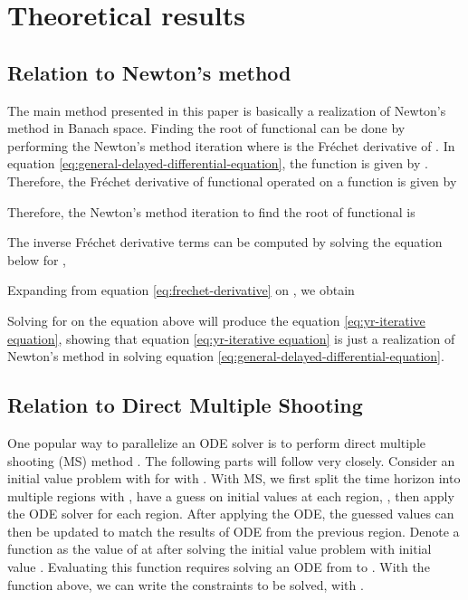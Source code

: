 \appendix

\section{Theoretical results}
\subsection{Relation to Newton's method}
\label{appsec:relation-to-newton}

The main method presented in this paper is basically a realization of Newton's method in Banach space.
Finding the root of functional  can be done by performing the Newton's method iteration  where  is the Fr\'{e}chet derivative of .
In equation \ref{eq:general-delayed-differential-equation}, the function  is given by .
Therefore, the Fr\'{e}chet derivative of functional  operated on a function  is given by

Therefore, the Newton's method iteration to find the root of functional  is

The inverse Fr\'{e}chet derivative terms can be computed by solving the equation below for ,

Expanding  from equation \ref{eq:frechet-derivative} on , we obtain

Solving for  on the equation above will produce the equation \ref{eq:yr-iterative equation}, showing that equation \ref{eq:yr-iterative equation} is just a realization of Newton's method in solving equation \ref{eq:general-delayed-differential-equation}.

\subsection{Relation to Direct Multiple Shooting}
\label{appsubsec:relation-to-direct-multiple-shooting}

One popular way to parallelize an ODE solver is to perform direct multiple shooting (MS) method \citep{chartier1993parallel, massaroli2021differentiablemultipleshooting}.
The following parts will follow \cite{massaroli2021differentiablemultipleshooting} very closely.
Consider an initial value problem with  for  with .
With MS, we first split the time horizon into  multiple regions with , have a guess on initial values at each region, , then apply the ODE solver for each region.
After applying the ODE, the guessed values  can then be updated to match the results of ODE from the previous region.
Denote a function  as the value of  at  after solving the initial value problem with initial value .
Evaluating this function  requires solving an ODE from  to .
With the function above, we can write the constraints to be solved,  with .

